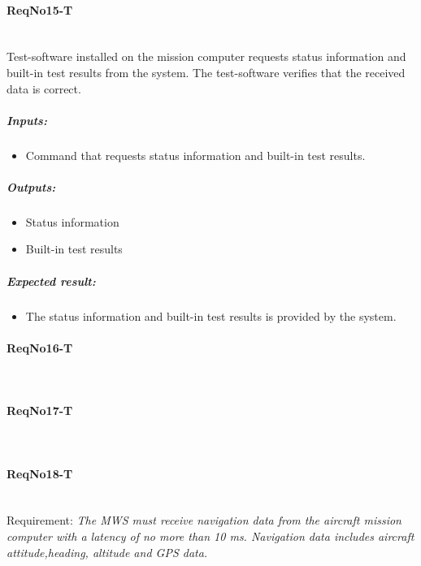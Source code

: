 \paragraph{ReqNo15-T}\mbox{}\\ %
Test-software installed on the mission computer requests status information and built-in test results from the system. The test-software verifies that the received data is correct.
\\
	\subparagraph{Inputs:}
	\begin{itemize}
	\item Command that requests status information and built-in test results. 
	\end{itemize}
	\subparagraph{Outputs:}
	\begin{itemize}
	\item Status information
	\item Built-in test results
	\end{itemize}
	\subparagraph{Expected result:}
	\begin{itemize}
	\item The status information and built-in test results is provided by the system.
	\end{itemize}

\paragraph{ReqNo16-T}\mbox{}\\ %


\paragraph{ReqNo17-T}\mbox{}\\ %

\paragraph{ReqNo18-T}\mbox{}\\ %
Requirement: \textit{The MWS must receive navigation data from the aircraft mission computer with a latency of no more than
10 ms. Navigation data includes aircraft attitude,heading, altitude and GPS data.}\\

